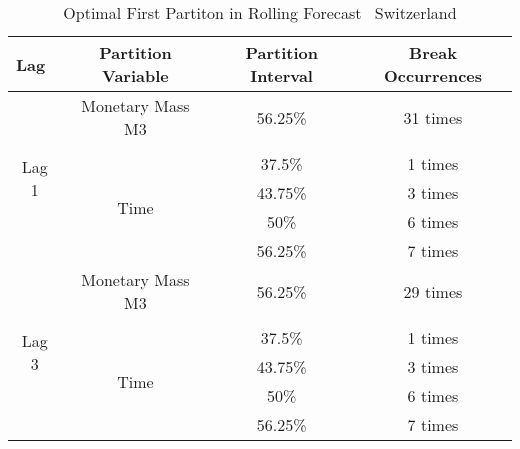 \begin{table}[t] %
  \centering
    \caption[Switzerland: GTS-OLS Optimal First Partition Split]{Optimal First Partiton in Rolling Forecast  \textendash \ Switzerland}
  \begin{tabular}{lccc} %
    \cmidrule(r){1-4}
    Lag                                             & Partition Variable                &  Partition Interval       & Break Occurrences \\
    \midrule
    \multicolumn{1}{c|}{\multirow{6}{*}{Lag 1}}     & Monetary Mass M3                  & 56.25\%                   & 31 times \\
    \multicolumn{1}{c|}{}                           &                                   &                           &          \\    
    \multicolumn{1}{c|}{}                           & \multirow{4}{*}{Time}             & 37.5\%                    & 1 times \\
    \multicolumn{1}{c|}{}                           &                                   & 43.75\%                   & 3 times \\
    \multicolumn{1}{c|}{}                           &                                   & 50\%                      & 6 times  \\
    \multicolumn{1}{c|}{}                           &                                   & 56.25\%                   & 7 times  \\ \cline{1-4}

    \multicolumn{1}{c|}{\multirow{6}{*}{Lag 3}}      & Monetary Mass M3                  & 56.25\%                   & 29 times \\
    \multicolumn{1}{c|}{}                           &                                   &                           &          \\    
    \multicolumn{1}{c|}{}                           & \multirow{4}{*}{Time}             & 37.5\%                    & 1 times \\
    \multicolumn{1}{c|}{}                           &                                   & 43.75\%                   & 3 times \\
    \multicolumn{1}{c|}{}                           &                                   & 50\%                      & 6 times  \\
    \multicolumn{1}{c|}{}                           &                                   & 56.25\%                   & 7 times  \\ \cline{1-4}


\end{tabular}
\end{table}
